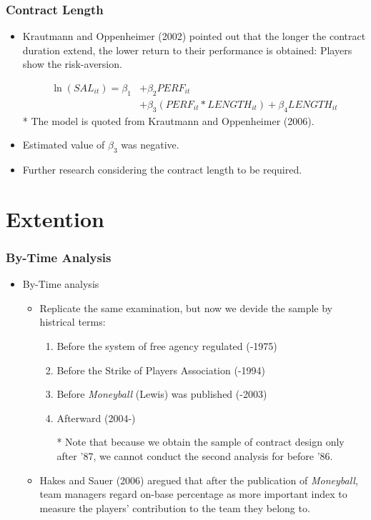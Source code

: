 \documentclass[dvipdfmx,12pt]{beamer}
\begin{document}
\begin{frame}\frametitle{Contract Length}
  \begin{itemize}
    \item Krautmann and Oppenheimer (2002) pointed out that the longer the contract duration extend, the lower return to their performance is obtained: Players show the risk-aversion.

    \begin{align*}
      \ln(SAL_{it}) = \beta_1 &+ \beta_2 PERF_{it} \\
      &+ \beta_3 (PERF_{it} * LENGTH_{it})+ \beta_4 LENGTH_{it}
    \end{align*}
    \footnotesize
    \flushright
    * The model is quoted from Krautmann and Oppenheimer (2006).

    \flushleft
    \normalsize

    \item Estimated value of $\beta_3$ was negative.

    \item Further research considering the contract length to be required.
  \end{itemize}
\end{frame}

\section*{Extention}

\begin{frame}\frametitle{By-Time Analysis}
  \begin{itemize}
    \item By-Time analysis
    \begin{itemize}
      \item Replicate the same examination, but now we devide the sample by histrical terms:
      \begin{enumerate}
        \item Before the system of free agency regulated (-1975)

        \item Before the Strike of Players Association (-1994)

        \item Before \textit{Moneyball} (Lewis) was published (-2003)

        \item Afterward (2004-)

        * Note that because we obtain the sample of contract design only after '87, we cannot conduct the second analysis for before '86.
      \end{enumerate}

      \item Hakes and Sauer (2006) aregued that after the publication of \textit{Moneyball}, team managers regard on-base percentage as more important index to measure the players' contribution to the team they belong to.

    \end{itemize}
  \end{itemize}
\end{frame}
\end{document}
